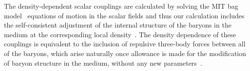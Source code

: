The density-dependent scalar couplings are calculated by solving the MIT bag model~\cite{Chodos:1974pn_Baryonstructurebag} equations of motion in the scalar fields and thus our calculation includes the self-consistent adjustment of the internal structure of the baryons in the medium at the corresponding local density~\cite{Guichon:1987jp_Possiblequarkmechanism,Guichon:1995ue_Rolenucleonstructure,Guichon:2018uew_QuarkMesonCouplingQMC}. The density dependence of these couplings is equivalent to the inclusion of repulsive three-body forces between all of the baryons, which arise naturally once allowance is made for the modification of baryon structure in the medium, without any new 
parameters~\cite{Guichon:2004xg_Quarkstructurenuclear,Thomas:2021kio_jul_Rolequarksnuclear}.